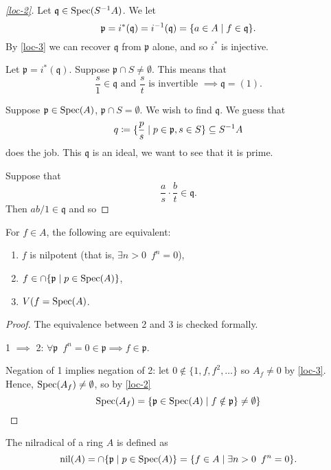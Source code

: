 \begin{proof}[\cref{loc-2}]
  Let $\mathfrak q \in \text{Spec}(S^{-1}A)$. We let
  \[ \mathfrak p = i^*(\mathfrak q) = i^{-1}(\mathfrak q) = \{a \in A \mathrel{|} f \in \mathfrak q \}.\]
  By \cref{loc-3} we can recover $\mathfrak q$ from $\mathfrak p$ alone, and so $i^*$ is injective.

  Let
  $\mathfrak p = i^* (\mathfrak q)$.
  Suppose
  $\mathfrak p \cap S \neq \emptyset$.
  This means that
  \[\frac{s}{1} \in \mathfrak q \text{ and } \frac{s}{t}  \text{ is invertible } \implies \mathfrak q = (1).\]

  Suppose $\mathfrak p \in \text{Spec}(A)$, $\mathfrak p \cap S = \emptyset$.
  We wish to find $\mathfrak q$. We guess that
  \[ q \coloneqq \{ \frac{p}{s} \mathrel{|} p \in \mathfrak p, s \in S \} \subseteq S^{-1}A\]
  does the job.
  This $\mathfrak q$ is an ideal, we want to see that it is prime.

  Suppose that
  \[ \frac{a}{s} \cdot \frac{b}{t} \in \mathfrak q .\]
  Then
  $ab / 1 \in \mathfrak q$
  and so
\end{proof}

\begin{corollary}
  For $f \in A$, the following are equivalent:
  \begin{enumerate}
  \item $f$ is nilpotent (that is, $\exists n > 0 \enspace f^n = 0$),
  \item $f \in \cap \{\mathfrak p \mathrel{|} p \in \text{Spec}(A) \}$,
  \item $V(f = \text{Spec}(A)$.
  \end{enumerate}
\end{corollary}

\begin{proof}
  The equivalence between 2 and 3 is checked formally.

  1 $\implies$ 2: $\forall \mathfrak p \enspace f^n = 0 \in \mathfrak p \implies f \in \mathfrak p$.

  Negation of 1 implies negation of 2:
  let
  $0 \notin \{ 1, f, f^2, \ldots \}$
  so $A_f \neq 0$ by \cref{loc-3}.
  Hence, $\text{Spec}(A_f) \neq \emptyset$, so by \cref{loc-2}
  \[ \text{Spec}(A_f) = \{ \mathfrak p \in \text{Spec}(A) \mathrel{|} f \notin \mathfrak p \} \neq \emptyset \} \]
\end{proof}

\begin{df}
  The nilradical of a ring $A$ is defined as
  \[ \text{nil}(A) = \cap \{ \mathfrak p \mathrel{|} p \in \text{Spec}(A) \} = \{f \in A \mathrel{|} \exists n > 0 \enspace f^n = 0 \}.\]
\end{df}

